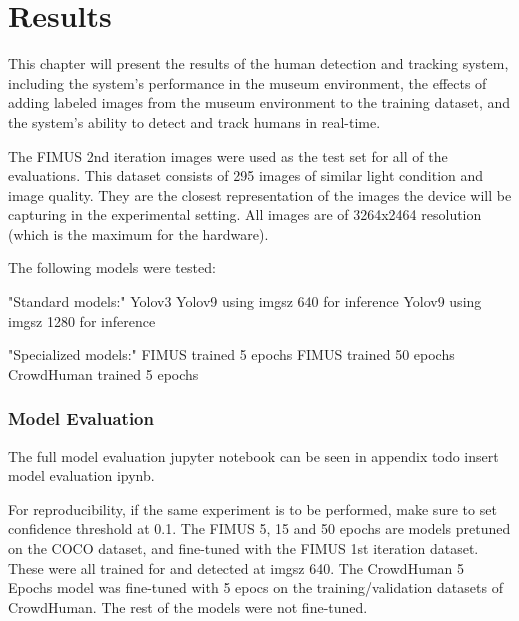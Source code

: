 \section{Results}
\label{sec:results}
This chapter will present the results of the human detection and tracking system, including the system's performance in the museum environment, the effects of adding labeled images from the museum environment to the training dataset, and the system's ability to detect and track humans in real-time.

The FIMUS 2nd iteration images were used as the test set for all of the evaluations. This dataset consists of 295 images of similar light condition and image quality. They are the closest representation of the images the device will be capturing in the experimental setting. All images are of 3264x2464 resolution (which is the maximum for the hardware).

The following models were tested:

"Standard models:"
	Yolov3
	Yolov9 using imgsz 640 for inference
	Yolov9 using imgsz 1280 for inference

"Specialized models:"
	FIMUS trained 5 epochs
	FIMUS trained 50 epochs
	CrowdHuman trained 5 epochs




\subsubsection*{Model Evaluation}
The full model evaluation jupyter notebook can be seen in appendix todo insert model evaluation ipynb.

For reproducibility, if the same experiment is to be performed, make sure to set confidence threshold at 0.1. The FIMUS 5, 15 and 50 epochs are models pretuned on the COCO dataset, and fine-tuned with the FIMUS 1st iteration dataset. These were all trained for and detected at imgsz 640. The CrowdHuman 5 Epochs model was fine-tuned with 5 epocs on the training/validation datasets of CrowdHuman. The rest of the models were not fine-tuned.

